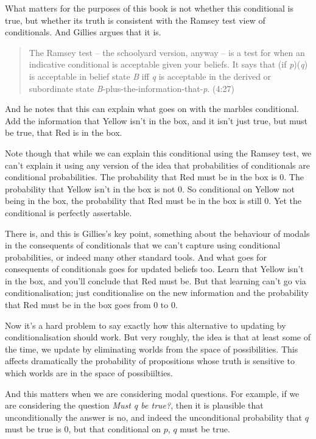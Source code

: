 \documentclass[11pt,]{book}
\begin{document}
What matters for the purposes of this book is not whether this conditional is true, but whether its truth is consistent with the Ramsey test view of conditionals. And Gillies argues that it is.

\begin{quote}
The Ramsey test -- the schoolyard version, anyway -- is a test for when an indicative conditional is acceptable given your beliefs. It says that (if \emph{p})(\emph{q}) is acceptable in belief state \emph{B} iff \emph{q} is acceptable in the derived or subordinate state \emph{B}-plus-the-information-that-\emph{p}. (4:27)
\end{quote}

And he notes that this can explain what goes on with the marbles conditional. Add the information that Yellow isn't in the box, and it isn't just true, but must be true, that Red is in the box.

Note though that while we can explain this conditional using the Ramsey test, we can't explain it using any version of the idea that probabilities of conditionals are conditional probabilities. The probability that Red must be in the box is 0. The probability that Yellow isn't in the box is not 0. So conditional on Yellow not being in the box, the probability that Red must be in the box is still 0. Yet the conditional is perfectly assertable.

There is, and this is Gillies's key point, something about the behaviour of modals in the consequents of conditionals that we can't capture using conditional probabilities, or indeed many other standard tools. And what goes for consequents of conditionals goes for updated beliefs too. Learn that Yellow isn't in the box, and you'll conclude that Red must be. But that learning can't go via conditionalisation; just conditionalise on the new information and the probability that Red must be in the box goes from 0 to 0.

Now it's a hard problem to say exactly how this alternative to updating by conditionalisation should work. But very roughly, the idea is that at least some of the time, we update by eliminating worlds from the space of possibilities. This affects dramatically the probability of propositions whose truth is sensitive to which worlds are in the space of possibiilties.

And this matters when we are considering modal questions. For example, if we are considering the question \emph{Must q be true?}, then it is plausible that unconditionally the answer is no, and indeed the unconditional probability that \(q\) must be true is 0, but that conditional on \(p\), \(q\) must be true.
\end{document}
